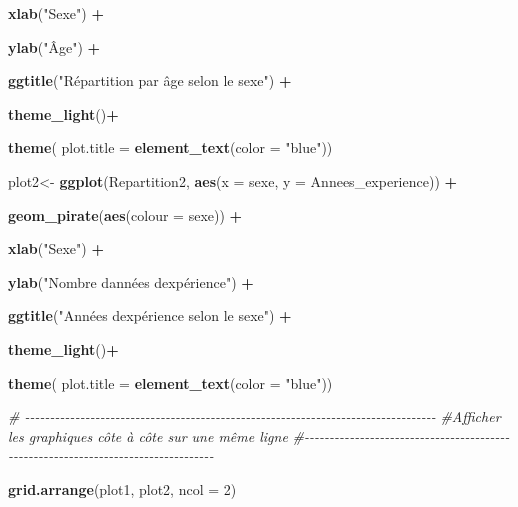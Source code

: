 \documentclass[
]{article}
\newenvironment{Shaded}{\begin{snugshade}}{\end{snugshade}}
\newcommand{\AttributeTok}[1]{\textcolor[rgb]{0.13,0.29,0.53}{#1}}
\newcommand{\CommentTok}[1]{\textcolor[rgb]{0.56,0.35,0.01}{\textit{#1}}}
\newcommand{\DecValTok}[1]{\textcolor[rgb]{0.00,0.00,0.81}{#1}}
\newcommand{\FunctionTok}[1]{\textcolor[rgb]{0.13,0.29,0.53}{\textbf{#1}}}
\newcommand{\NormalTok}[1]{#1}
\newcommand{\OtherTok}[1]{\textcolor[rgb]{0.56,0.35,0.01}{#1}}
\newcommand{\SpecialCharTok}[1]{\textcolor[rgb]{0.81,0.36,0.00}{\textbf{#1}}}
\newcommand{\StringTok}[1]{\textcolor[rgb]{0.31,0.60,0.02}{#1}}
\begin{document}
\begin{Shaded}
\begin{Highlighting}[]
  \FunctionTok{xlab}\NormalTok{(}\StringTok{"Sexe"}\NormalTok{) }\SpecialCharTok{+}
  
  \FunctionTok{ylab}\NormalTok{(}\StringTok{"Âge"}\NormalTok{) }\SpecialCharTok{+}
  
  \FunctionTok{ggtitle}\NormalTok{(}\StringTok{"Répartition par âge selon le sexe"}\NormalTok{) }\SpecialCharTok{+}
  
  \FunctionTok{theme\_light}\NormalTok{()}\SpecialCharTok{+}
  
  \FunctionTok{theme}\NormalTok{(}
    \AttributeTok{plot.title =} \FunctionTok{element\_text}\NormalTok{(}\AttributeTok{color =} \StringTok{"blue"}\NormalTok{))}

\NormalTok{plot2}\OtherTok{\textless{}{-}} \FunctionTok{ggplot}\NormalTok{(Repartition2, }\FunctionTok{aes}\NormalTok{(}\AttributeTok{x =}\NormalTok{ sexe, }\AttributeTok{y =}\NormalTok{ Annees\_experience)) }\SpecialCharTok{+}
  
  \FunctionTok{geom\_pirate}\NormalTok{(}\FunctionTok{aes}\NormalTok{(}\AttributeTok{colour =}\NormalTok{ sexe)) }\SpecialCharTok{+}
  
  \FunctionTok{xlab}\NormalTok{(}\StringTok{"Sexe"}\NormalTok{) }\SpecialCharTok{+}
  
  \FunctionTok{ylab}\NormalTok{(}\StringTok{"Nombre d\textquotesingle{}années d\textquotesingle{}expérience"}\NormalTok{) }\SpecialCharTok{+}
  
  \FunctionTok{ggtitle}\NormalTok{(}\StringTok{"Années d\textquotesingle{}expérience selon le sexe"}\NormalTok{) }\SpecialCharTok{+}
  
  \FunctionTok{theme\_light}\NormalTok{()}\SpecialCharTok{+}
  
  \FunctionTok{theme}\NormalTok{(}
    \AttributeTok{plot.title =} \FunctionTok{element\_text}\NormalTok{(}\AttributeTok{color =} \StringTok{"blue"}\NormalTok{))}

\CommentTok{\# {-}{-}{-}{-}{-}{-}{-}{-}{-}{-}{-}{-}{-}{-}{-}{-}{-}{-}{-}{-}{-}{-}{-}{-}{-}{-}{-}{-}{-}{-}{-}{-}{-}{-}{-}{-}{-}{-}{-}{-}{-}{-}{-}{-}{-}{-}{-}{-}{-}{-}{-}{-}{-}{-}{-}{-}{-}{-}{-}{-}{-}{-}{-}{-}{-}{-}{-}{-}{-}{-}{-}{-}{-}{-}{-}{-}{-}{-}{-}{-}{-}{-}}
\CommentTok{\#Afficher les graphiques côte à côte sur une même ligne}
\CommentTok{\#{-}{-}{-}{-}{-}{-}{-}{-}{-}{-}{-}{-}{-}{-}{-}{-}{-}{-}{-}{-}{-}{-}{-}{-}{-}{-}{-}{-}{-}{-}{-}{-}{-}{-}{-}{-}{-}{-}{-}{-}{-}{-}{-}{-}{-}{-}{-}{-}{-}{-}{-}{-}{-}{-}{-}{-}{-}{-}{-}{-}{-}{-}{-}{-}{-}{-}{-}{-}{-}{-}{-}{-}{-}{-}{-}{-}{-}{-}{-}{-}{-}{-}}

\FunctionTok{grid.arrange}\NormalTok{(plot1, plot2, }\AttributeTok{ncol =} \DecValTok{2}\NormalTok{)}
\end{Highlighting}
\end{Shaded}
\end{document}
